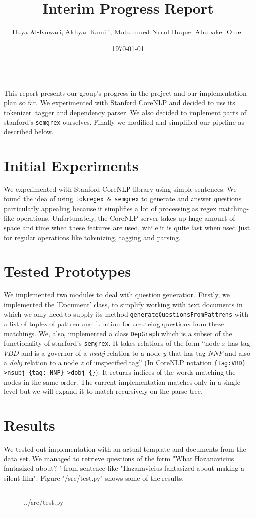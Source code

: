 \documentclass{article}
\title{Interim Progress Report}
\author{Haya Al-Kuwari, Akhyar Kamili, Mohammed Nurul Hoque, Abubaker Omer}
\date{\today}
\newcommand{\code}[1] {
	\noindent\rule{\textwidth}{0.4pt}
	#1
	\vspace{-0.3em}
	\par\noindent\rule{\textwidth}{0.4pt}
	\vspace{-1.7\baselineskip}
	
}
\begin{document}
    \maketitle
    \noindent\rule{\textwidth}{1pt}
    This report presents our group's progress in the project and our implementation plan so far. We
    experimented with Stanford CoreNLP and decided to use its tokenizer, tagger and dependency
    parser. We also decided to implement parts of stanford's \texttt{semgrex} ourselves. Finally we
    modified and simplified our pipeline as described below.

    \section{Initial Experiments}
    We experimented with Stanford CoreNLP library using simple sentences. We found the idea of using
    \texttt{tokregex \& semgrex} to generate and answer questions particularly appealing because it
    simplifies a lot of processing as regex matching-like operations. Unfortunately, the CoreNLP
    server takes up huge amount of space and time when these features are used, while it is quite
    fast when used just for regular operations like tokenizing, tagging and parsing.

    \section{Tested Prototypes}
    We implemented two modules to deal with question generation. Firstly, we implemented the
    'Document' class, to simplify working with text documents in which we only need to supply its
    method \texttt{generateQuestionsFromPattrens} with a list of tuples of pattren and function for
    createing questions from these matchings. We, also, implemented a class \texttt{DepGraph} which
    is a subset of the functionality of stanford's \texttt{semgrex}. It takes relations of the form
    ``node $x$ has tag $VBD$ and is a governor of a \textit{nsubj} relation to a node $y$ that has
    tag \textit{NNP} and also a \textit{dobj} relation to a node $z$ of unspecified tag'' (In
    CoreNLP notation \texttt{\{tag:VBD\} >nsubj \{tag: NNP\} >dobj \{\}}). It returns indices of the
    words matching the nodes in the same order. The current implementation matches only in a single
    level but we will expand it to match recursively on the parse tree.

    \section{Results}
    We tested out implementation with an actual template and documents from the data set. We managed to retrieve questions of the form "What Hazanavicius fantasized about? " from sentence like "Hazanavicius fantasized about making a silent film". Figure "/src/test.py" shows some of
    the results.

    \begin{figure}
        \code{../src/test.py}
    \end{figure}
    
\end{document}
